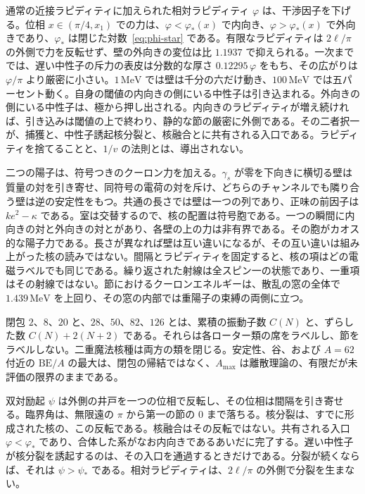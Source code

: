 \documentclass[a4paper]{article}
\begin{document}
通常の近接ラピディティに加えられた相対ラピディティ \(\varphi\) は、干渉因子を下げる。位相 \(x\in(\pi/4,x_1)\) での力は、\(\varphi<\varphi_*(x)\) で内向き、\(\varphi>\varphi_*(x)\) で外向きであり、\(\varphi_*\) は閉じた対数~\eqref{eq:phi-star} である。有限なラピディティは \(2\ell/\pi\) の外側で力を反転せず、壁の外向きの変位は比 \(1.1937\) で抑えられる。一次まででは、遅い中性子の斥力の表皮は分数的な厚さ \(0.12295\,\varphi\) をもち、その広がりは \(\varphi/\pi\) より厳密に小さい。\(1\,\mathrm{MeV}\) では壁は千分の六だけ動き、\(100\,\mathrm{MeV}\) では五パーセント動く。自身の閾値の内向きの側にいる中性子は引き込まれる。外向きの側にいる中性子は、極から押し出される。内向きのラピディティが増え続ければ、引き込みは閾値の上で終わり、静的な節の厳密に外側である。その二者択一が、捕獲と、中性子誘起核分裂と、核融合とに共有される入口である。ラピディティを捨てることと、\(1/v\) の法則とは、導出されない。

二つの陽子は、符号つきのクーロン力を加える。\(\gamma_s\) が零を下向きに横切る壁は質量の対を引き寄せ、同符号の電荷の対を斥け、どちらのチャンネルでも隣り合う壁は逆の安定性をもつ。共通の長さでは壁は一つの列であり、正味の前因子は \(ke^{2}-\kappa\) である。室は交替するので、核の配置は符号胞である。一つの瞬間に内向きの対と外向きの対とがあり、各壁の上の力は非有界である。その胞がカオス的な陽子力である。長さが異なれば壁は互い違いになるが、その互い違いは組み上がった核の読みではない。間隔とラピディティを固定すると、核の項はどの電磁ラベルでも同じである。繰り返された射線は全スピン一の状態であり、一重項はその射線ではない。節におけるクーロンエネルギーは、散乱の窓の全体で \(1.439\,\mathrm{MeV}\) を上回り、その窓の内部では重陽子の束縛の両側に立つ。

閉包 \(2\)、\(8\)、\(20\) と、\(28\)、\(50\)、\(82\)、\(126\) とは、累積の振動子数 \(C(N)\) と、ずらした数 \(C(N)+2(N+2)\) である。それらは各ローター類の席をラベルし、節をラベルしない。二重魔法核種は両方の類を閉じる。安定性、谷、および \(A=62\) 付近の \(\mathrm{BE}/A\) の最大は、閉包の帰結ではなく、\(A_{\max}\) は離散理論の、有限だが未評価の限界のままである。

双対励起 \(\psi\) は外側の井戸を一つの位相で反転し、その位相は間隔を引き寄せる。臨界角は、無限遠の \(\pi\) から第一の節の \(0\) まで落ちる。核分裂は、すでに形成された核の、この反転である。核融合はその反転ではない。共有される入口 \(\varphi<\varphi_*\) であり、合体した系がなお内向きであるあいだに完了する。遅い中性子が核分裂を誘起するのは、その入口を通過するときだけである。分裂が続くならば、それは \(\psi>\psi_*\) である。相対ラピディティは、\(2\ell/\pi\) の外側で分裂を生まない。
\end{document}

